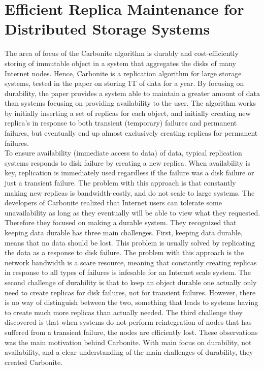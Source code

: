 \documentclass{article}
\begin{document}
\section*{Efficient Replica Maintenance for Distributed Storage Systems}

The area of focus of the Carbonite algorithm is durably and cost-efficiently storing of immutable object in a system that aggregates the disks of many Internet nodes. Hence, Carbonite is a replication algorithm for large storage systems, tested in the paper on storing 1T of data for a year. By focusing on durability, the paper provides a system able to maintain a greater amount of data than systems focusing on providing availability to the user. The algorithm works by initially inserting a set of replicas for each object, and initially creating new replica's in response to both transient (temporary) failures and permanent failures, but eventually end up almost exclusively creating replicas for permanent failures. \\

\noindent To ensure availability (immediate access to data) of data, typical replication systems responds to disk failure by creating a new replica. When availability is key, replication is immediately used regardless if the failure was a disk failure or just a transient failure. The problem with this approach is that constantly making new replicas is bandwidth-costly, and do not scale to large systems. The developers of Carbonite realized that Internet users can tolerate some unavailability as long as they eventually will be able to view what they requested. Therefore they focused on making a durable system. They recognized that keeping data durable has three main challenges. First, keeping data durable, means that no data should be lost. This problem is usually solved by replicating the data as a response to disk failure. The problem with this approach is the network bandwidth is a scare resource, meaning that constantly creating replicas in response to all types of failures is infesable for an Internet scale system. The second challenge of durability is that to keep an object durable one actually only need to create replicas for disk failures, not for transient failures. However, there is no way of distinguish between the two, something that leads to systems having to create much more replicas than actually needed. The third challenge they discovered is that when systems do not perform reintegration of nodes that has suffered from a transient failure, the nodes are efficiently lost. These observations was the main motivation behind Carbonite. With main focus on durability, not availability, and a clear understanding of the main challenges of durability, they created Carbonite.\\
\end{document}
